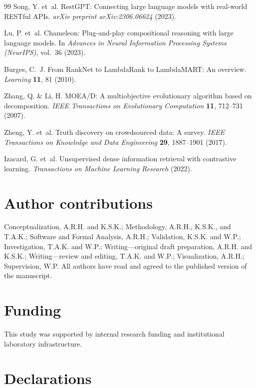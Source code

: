 \documentclass[fleqn,10pt]{article}
\begin{document}
\begin{thebibliography}{99}
Song, Y. et~al. RestGPT: Connecting large language models with real-world RESTful APIs. \textit{arXiv preprint arXiv:2306.06624} (2023).

Lu, P. et~al. Chameleon: Plug-and-play compositional reasoning with large language models. In \textit{Advances in Neural Information Processing Systems (NeurIPS)}, vol.~36 (2023).

Burges, C.~J. From RankNet to LambdaRank to LambdaMART: An overview. \textit{Learning} \textbf{11}, 81 (2010).

Zhang, Q. \& Li, H. MOEA/D: A multiobjective evolutionary algorithm based on decomposition. \textit{IEEE Transactions on Evolutionary Computation} \textbf{11}, 712--731 (2007).

Zheng, Y. et~al. Truth discovery on crowdsourced data: A survey. \textit{IEEE Transactions on Knowledge and Data Engineering} \textbf{29}, 1887--1901 (2017).

Izacard, G. et~al. Unsupervised dense information retrieval with contrastive learning. \textit{Transactions on Machine Learning Research} (2022).
\end{thebibliography}

\section*{Author contributions}
Conceptualization, A.R.H. and K.S.K.; Methodology, A.R.H., K.S.K., and T.A.K.; Software and Formal Analysis, A.R.H.; Validation, K.S.K. and W.P.; Investigation, T.A.K. and W.P.; Writing---original draft preparation, A.R.H. and K.S.K.; Writing---review and editing, T.A.K. and W.P.; Visualization, A.R.H.; Supervision, W.P. All authors have read and agreed to the published version of the manuscript.

\section*{Funding}
This study was supported by internal research funding and institutional laboratory infrastructure.

\section*{Declarations}
\end{document}
